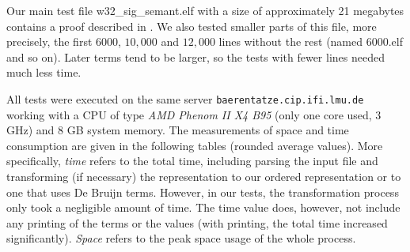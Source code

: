 \documentclass[submission,copyright,creativecommons]{eptcs}
\begin{document}
Our main test file \textsf{w32\_sig\_semant.elf} with a size of
approximately 21 megabytes contains a proof described in
\cite{appel:toplas10}. We also tested smaller parts of this file, more
precisely, the first $6000$, $10,000$ and $12,000$ lines without the
rest (named \textsf{6000.elf} and so on). Later terms tend to be
larger, so the tests with fewer lines needed much less time.

All tests were executed on the same server 
\mbox{\texttt{baerentatze.cip.ifi.lmu.de}}
working with a CPU of type \emph{AMD Phenom II X4 B95} (only
one core used, 3 GHz) and 8 GB system memory. The measurements
of space and time consumption are given in the following tables (rounded
average values). More specifically, \emph{time} refers to the total time, including parsing the input file and transforming (if necessary) the representation to our ordered representation or to one that uses De Bruijn terms. However, in our tests, the transformation process only took a negligible amount of time. The time value does, however, not include any printing of the terms or the values (with printing, the total time increased significantly). \emph{Space} refers to the peak space usage of the whole process.
\end{document}
